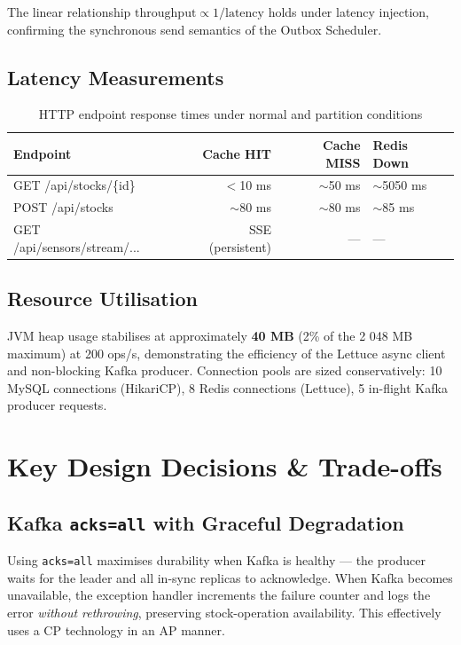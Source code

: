 \documentclass[12pt,a4paper,twoside]{article}
\begin{document}
The linear relationship $\text{throughput} \propto 1/\text{latency}$
holds under latency injection, confirming the synchronous send semantics
of the Outbox Scheduler.

\subsection{Latency Measurements}

\begin{table}[H]
\centering
\caption{HTTP endpoint response times under normal and partition conditions}
\label{tab:latency}
\begin{tabular}{@{}lrrl@{}}
\toprule
\textbf{Endpoint}            & \textbf{Cache HIT} & \textbf{Cache MISS} & \textbf{Redis Down} \\
\midrule
GET /api/stocks/\{id\}       & $<$10 ms  & $\sim$50 ms  & $\sim$5050 ms \\
POST /api/stocks             & $\sim$80 ms & $\sim$80 ms & $\sim$85 ms \\
GET /api/sensors/stream/...  & SSE (persistent) & — & — \\
\bottomrule
\end{tabular}
\end{table}

\subsection{Resource Utilisation}

JVM heap usage stabilises at approximately \textbf{40 MB} (2\% of the
2 048 MB maximum) at 200 ops/s, demonstrating the efficiency of the
Lettuce async client and non-blocking Kafka producer.
Connection pools are sized conservatively: 10 MySQL connections
(HikariCP), 8 Redis connections (Lettuce), 5 in-flight Kafka producer
requests.

\section{Key Design Decisions \& Trade-offs}
\label{sec:design}

\subsection{Kafka \texttt{acks=all} with Graceful Degradation}

Using \texttt{acks=all} maximises durability when Kafka is healthy —
the producer waits for the leader and all in-sync replicas to
acknowledge.
When Kafka becomes unavailable, the exception handler increments the
failure counter and logs the error \emph{without rethrowing}, preserving
stock-operation availability.
This effectively uses a CP technology in an AP manner.
\end{document}
